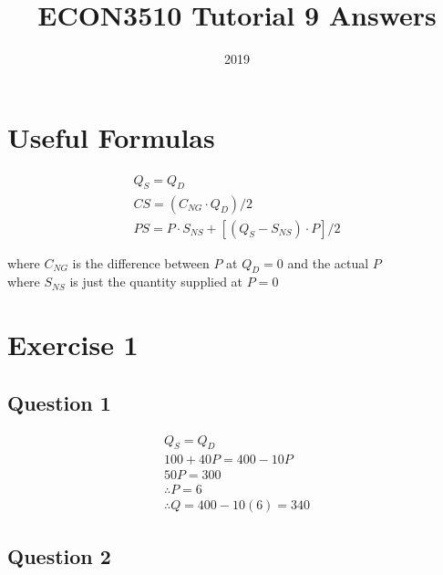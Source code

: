 \documentclass{article}
\title{ECON3510 Tutorial 9 Answers}
\date{2019}
\begin{document}
\maketitle

\section{Useful Formulas}

\begin{gather*}
  Q_{S} = Q_{D} \\
  CS = (C_{NG} \cdot Q_{D})/2 \\
  PS = P \cdot S_{NS} + [(Q_{S} - S_{NS}) \cdot P]/2
\end{gather*}

where $C_{NG}$ is the difference between $P$ at $Q_{D}=0$ and the actual $P$ \\
where $S_{NS}$ is just the quantity supplied at $P=0$


\section{Exercise 1}
\vspace{6mm}
\subsection{Question 1}

\begin{gather*}
  Q_{S} = Q_{D} \\
  100 + 40P = 400 - 10P \\
  50P = 300 \\
  \therefore P = 6 \\
  \therefore Q = 400 - 10(6) = 340
\end{gather*}

\par \vspace{0.8em}
\subsection{Question 2}
\end{document}
